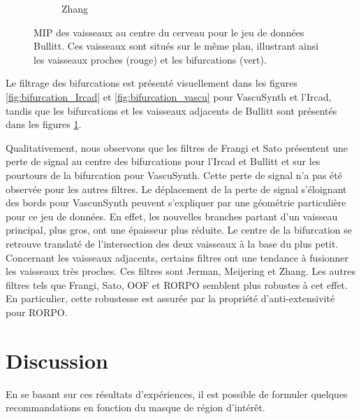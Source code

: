 \begin{figure}[H]
\begin{subfigure}[t]{0.33\textwidth}
          \caption{Zhang}
        \end{subfigure}
      
        \caption{
        MIP des vaisseaux au centre du cerveau pour le jeu de données Bullitt. Ces vaisseaux sont situés sur le même plan, illustrant ainsi les vaisseaux proches (rouge) et les bifurcations (vert).}
      \label{fig:bifurcation_Bullitt}
\end{figure}

Le filtrage des bifurcations est présenté visuellement dans les figures \ref{fig:bifurcation_Ircad} et \ref{fig:bifurcation_vascu} pour VascuSynth et l'Ircad, tandis que les bifurcations et les vaisseaux adjacents de Bullitt sont présentés dans les figures \ref{fig:bifurcation_Bullitt}.

Qualitativement, nous observons que les filtres de Frangi et Sato présentent une perte de signal au centre des bifurcations pour l'Ircad et Bullitt et sur les pourtours de la bifurcation pour VascuSynth. Cette perte de signal n'a pas été observée pour les autres filtres. Le déplacement de la perte de signal s'éloignant des bords pour VascunSynth peuvent s'expliquer par une géométrie particulière pour ce jeu de données. En effet, les nouvelles branches partant d'un vaisseau principal, plus gros, ont une épaisseur plus réduite. Le centre de la bifurcation se retrouve translaté de l'intersection des deux vaisseaux à la base du plus petit. Concernant les vaisseaux adjacents, certains filtres ont une tendance à fusionner les vaisseaux très proches. Ces filtres sont Jerman, Meijering et Zhang. Les autres filtres tels que Frangi, Sato, OOF et RORPO semblent plus robustes à cet effet. En particulier, cette robustesse est assurée par la propriété d'anti-extensivité pour RORPO.

\section{Discussion}

En se basant sur ces résultats d'expériences, il est possible de formuler quelques recommandations en fonction du masque de région d'intérêt.

